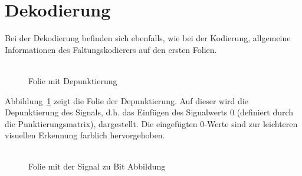 \section{Dekodierung}
\label{kapitel:visualisierung_dekodierung}
Bei der Dekodierung befinden sich ebenfalls, wie bei der Kodierung, allgemeine Informationen des Faltungskodierers auf den ersten Folien.
\\
\\
\begin{figure}[th]
	\centering
	\caption{Folie mit Depunktierung}
	\label{abb:folie_depunktierung}
\end{figure}
Abbildung~\ref{abb:folie_depunktierung} zeigt die Folie der Depunktierung. Auf dieser wird die Depunktierung des Signals, d.h. das Einfügen des Signalwerts 0 (definiert durch die Punktierungsmatrix), dargestellt. Die eingefügten 0-Werte sind zur leichteren visuellen Erkennung farblich hervorgehoben.
\\
\\
\begin{figure}[th]
	\centering
	\caption{Folie mit der Signal zu Bit Abbildung}
	\label{abb:folie_signal_zu_bit_abbildung}
\end{figure}

